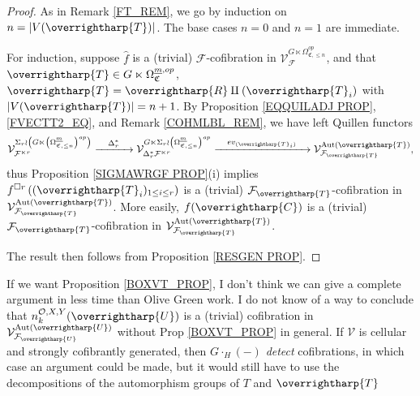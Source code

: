 \documentclass[a4paper,10pt
,draft
]{article}%
\numberwithin{equation}{section}
\numberwithin{figure}{section}
\theoremstyle{definition} %
\newcommand{\vect}[1]{\text{\overrightharp{\ensuremath{#1}}}}
\DeclareMathOperator{\Aut}{Aut}%
\newcommand{\F}{\ensuremath{\mathcal F}}
\newcommand{\V}{\ensuremath{\mathcal V}}
\renewcommand{\O}{\ensuremath{\mathcal O}}
\newcommand{\1}{\ensuremath{\mathbbm 1}}%
\begin{document}
\begin{proof}
      As in Remark \ref{FT_REM}, we go by induction on $n = |V(\vect T)|$.
      The base cases $n = 0$ and $n=1$ are immediate.

      For induction, suppose $\hat f$ is a (trivial) $\F$-cofibration in $\V^{G \ltimes \Omega_{\mathfrak C, \leq n}^{op}}_{\F}$,
      and that $\vect T \in G \ltimes \Omega_{\mathfrak C}^{\underline{m},op}$, $\vect T = \vect R \amalg (\vect T_i)$ with $|V(\vect T)| = n+1$.
      By Proposition \ref{EQQUILADJ PROP}, \eqref{FVECTT2_EQ}, and Remark \ref{COHMLBL_REM}, we have left Quillen functors
      \[
            \V^{\Sigma_r \wr \left(G \ltimes \left(\Omega_{\mathfrak C, \leq n}^{\underline{m}}\right)^{op}\right)}_{\F^{\ltimes r}}
            \xrightarrow{\quad \Delta_r^{\**} \quad}
            \V^{G \ltimes \Sigma_r \wr \left(\Omega_{\mathfrak C, \leq n}^{\underline{m}}\right)^{op}}_{\Delta_r^{\**}\F^{\ltimes r}}
            \xrightarrow{\quad ev_{(\vect T_i)} \quad}
            \V^{\Aut(\vect T)}_{\F_{\vect T}},
      \]
      thus Proposition \ref{SIGMAWRGF PROP}(i) implies
      $f^{\square r}\left((\vect T_i)_{1 \leq i \leq r}\right)$ is a (trivial) $\F_{\vect T}$-cofibration in $\V^{\Aut(\vect T)}_{\F_{\vect T}}$.
      More easily, $f(\vect C)$ is a (trivial) $\F_{\vect T}$-cofibration in $\V^{\Aut(\vect T)}_{\F_{\vect T}}$.

      The result then follows from Proposition \ref{RESGEN PROP}.      
\end{proof}




{\color{Orange}
  If we want Proposition  \ref{BOXVT_PROP}, I don't think we can give a complete argument in less time than {\color{OliveGreen} Olive Green work}.%
  I do not know of a way to conclude that $n_k^{\O,X,Y}(\vect U)$ is a (trivial) cofibration in $\V^{\Aut(\vect U)}_{\F_{\vect U}}$
  without Prop \ref{BOXVT_PROP} in general.%
  If $\V$ is cellular and strongly cofibrantly generated, then $G \cdot_H (-)$ \textit{detect} cofibrations,%
  in which case an argument could be made, but it would still have to use the decompositions of the automorphism groups of $T$ and $\vect T$
}
\end{document}
